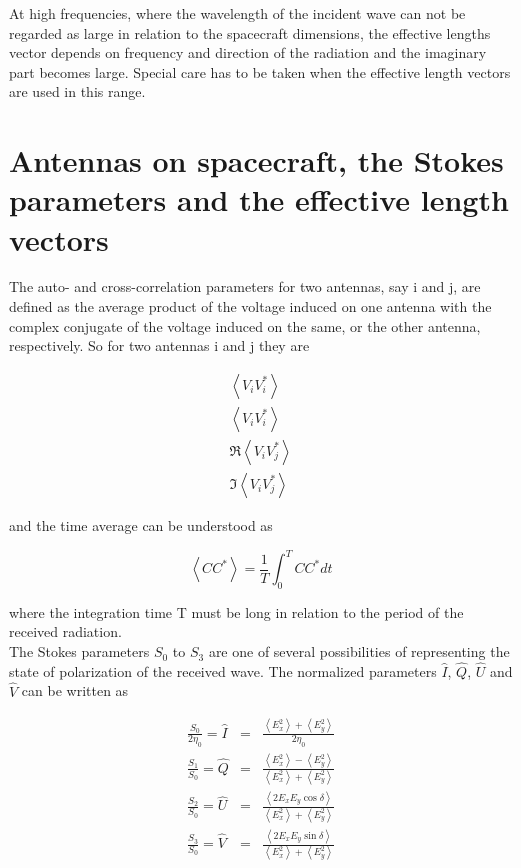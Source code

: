 \documentclass[galley,ras]{agu2001}
\begin{document}
\begin{article}
At high frequencies, where the wavelength of the incident wave can not be regarded as large in relation to the spacecraft dimensions, the effective lengths vector depends on frequency and direction of the radiation and the imaginary part becomes large. Special care has to be taken when the effective length vectors are used in this range.


\section{Antennas on spacecraft, the Stokes parameters and the effective length vectors}

The auto- and cross-correlation parameters for two antennas, say i and j, are defined as the average product of the voltage induced on one antenna with the complex conjugate of the voltage induced on the same, or the other antenna, respectively. So for two antennas i and j they are

\begin{eqnarray}
  \left\langle V_i V_i^* \right\rangle  \nonumber \\
 \left\langle V_i V_i^* \right\rangle  \nonumber \\
 \Re \left\langle V_i V_j^* \right\rangle  \nonumber \\
 \Im \left\langle V_i V_j^* \right\rangle \nonumber
\end{eqnarray}

and the time average can be understood as

\begin{equation}
 \left\langle CC^* \right\rangle = \frac{1}{T}\int_0^T CC^* dt
 \end{equation}

where the integration time T must be long in relation to the period of the received radiation.\\

The Stokes parameters $S_0$ to $S_3$ are one of several possibilities of representing the state of polarization of the received wave. The normalized parameters $\hat{I}$, $\hat{Q}$, $\hat{U}$ and $\hat{V}$ can be written as


\begin{eqnarray} \frac{S_0}{2\eta_0} = \hat{I} &=& \frac{\left\langle E_{x}^2\right\rangle +\left\langle E_{y}^2\right\rangle}{2\eta_0} \label{norm_stokes_1} \\
\frac{S_1}{S_0}=\hat{Q}&=&\frac{\left\langle E_{x}^2\right\rangle-\left\langle E_{y}^2\right\rangle}{\left\langle E_{x}^2\right\rangle +\left\langle E_{y}^2\right\rangle}\label{norm_stokes_2} \\ \frac{S_2}{S_0}=\hat{U}&=&\frac{\left\langle2E_{x} E_{y} \cos\delta\right\rangle}{\left\langle E_{x}^2\right\rangle +\left\langle E_{y}^2\right\rangle}
\label{norm_stokes_3} \\
\frac{S_3}{S_0}=\hat{V}&=&\frac{\left\langle2E_{x} E_{y} \sin\delta\right\rangle}{\left\langle E_{x}^2\right\rangle +\left\langle E_{y}^2\right\rangle}\label{norm_stokes_4}
\end{eqnarray}


\end{article}
\end{document}
